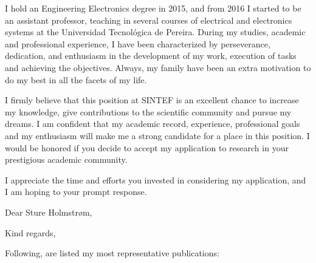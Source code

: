 \documentclass[11pt,a4paper,sans,english]{moderncv}        %
\begin{document}
I hold an Engineering Electronics degree in 2015, and from 2016 I started to be an assistant professor, teaching in several courses of electrical and electronics systems at the Universidad Tecnológica de Pereira. During my studies, academic and professional experience, I have been characterized by perseverance, dedication, and enthusiasm in the development of my work, execution of tasks and achieving the objectives. Always, my family have been an extra motivation to do my best in all the facets of my life.

I firmly believe that this position at SINTEF is an excellent chance to increase my knowledge, give contributions to the scientific community and pursue my dreams. I am confident that my academic record, experience, professional goals and my enthusiasm will make me a strong candidate for a place in this position. I would be honored if you decide to accept my application to research in your prestigious academic community.

I appreciate the time and efforts you invested in considering my application, and I am hoping to your prompt response.
\makeletterclosing
\clearpage

\date{February 14, 2019}
\opening{Dear Sture Holmstrøm,}
\closing{Kind regards,}
\makelettertitle

Following, are listed my most representative publications:
\end{document}
